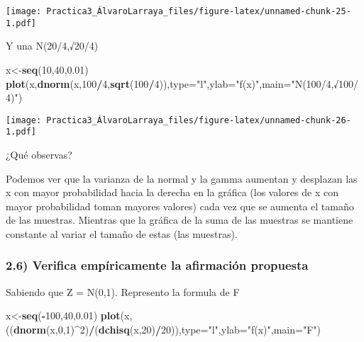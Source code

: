 \documentclass[
]{article}
\newenvironment{Shaded}{\begin{snugshade}}{\end{snugshade}}
\newcommand{\DataTypeTok}[1]{\textcolor[rgb]{0.13,0.29,0.53}{#1}}
\newcommand{\DecValTok}[1]{\textcolor[rgb]{0.00,0.00,0.81}{#1}}
\newcommand{\FloatTok}[1]{\textcolor[rgb]{0.00,0.00,0.81}{#1}}
\newcommand{\KeywordTok}[1]{\textcolor[rgb]{0.13,0.29,0.53}{\textbf{#1}}}
\newcommand{\NormalTok}[1]{#1}
\newcommand{\OperatorTok}[1]{\textcolor[rgb]{0.81,0.36,0.00}{\textbf{#1}}}
\newcommand{\StringTok}[1]{\textcolor[rgb]{0.31,0.60,0.02}{#1}}
\begin{document}
\texttt{[image: Practica3\_ÁlvaroLarraya\_files/figure-latex/unnamed-chunk-25-1.pdf]}

Y una N(20/4,√20/4)

\begin{Shaded}
\begin{Highlighting}[]
\NormalTok{x<-}\KeywordTok{seq}\NormalTok{(}\DecValTok{10}\NormalTok{,}\DecValTok{40}\NormalTok{,}\FloatTok{0.01}\NormalTok{)}
\KeywordTok{plot}\NormalTok{(x,}\KeywordTok{dnorm}\NormalTok{(x,}\DecValTok{100}\OperatorTok{/}\DecValTok{4}\NormalTok{,}\KeywordTok{sqrt}\NormalTok{(}\DecValTok{100}\OperatorTok{/}\DecValTok{4}\NormalTok{)),}\DataTypeTok{type=}\StringTok{"l"}\NormalTok{,}\DataTypeTok{ylab=}\StringTok{"f(x)"}\NormalTok{,}\DataTypeTok{main=}\StringTok{"N(100/4,√100/4)"}\NormalTok{)}
\end{Highlighting}
\end{Shaded}

\texttt{[image: Practica3\_ÁlvaroLarraya\_files/figure-latex/unnamed-chunk-26-1.pdf]}

¿Qué observas?

Podemos ver que la varianza de la normal y la gamma aumentan y desplazan
las x con mayor probabilidad hacia la derecha en la gráfica (los valores
de x con mayor probabilidad toman mayores valores) cada vez que se
aumenta el tamaño de las muestras. Mientras que la gráfica de la suma de
las muestras se mantiene constante al variar el tamaño de estas (las
muestras).

\hypertarget{verifica-empuxedricamente-la-afirmaciuxf3n-propuesta}{%
\subsubsection{2.6) Verifica empíricamente la afirmación
propuesta}\label{verifica-empuxedricamente-la-afirmaciuxf3n-propuesta}}

Sabiendo que Z = N(0,1). Represento la formula de F

\begin{Shaded}
\begin{Highlighting}[]
\NormalTok{x<-}\KeywordTok{seq}\NormalTok{(}\OperatorTok{-}\DecValTok{100}\NormalTok{,}\DecValTok{40}\NormalTok{,}\FloatTok{0.01}\NormalTok{)}
\KeywordTok{plot}\NormalTok{(x,((}\KeywordTok{dnorm}\NormalTok{(x,}\DecValTok{0}\NormalTok{,}\DecValTok{1}\NormalTok{)}\OperatorTok{^}\DecValTok{2}\NormalTok{)}\OperatorTok{/}\NormalTok{(}\KeywordTok{dchisq}\NormalTok{(x,}\DecValTok{20}\NormalTok{)}\OperatorTok{/}\DecValTok{20}\NormalTok{)),}\DataTypeTok{type=}\StringTok{"l"}\NormalTok{,}\DataTypeTok{ylab=}\StringTok{"f(x)"}\NormalTok{,}\DataTypeTok{main=}\StringTok{"F"}\NormalTok{)}
\end{Highlighting}
\end{Shaded}
\end{document}
